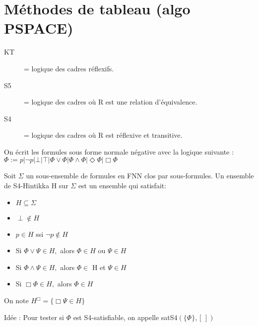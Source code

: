 \documentclass[10pt,a4paper]{article}
\begin{document}
\section{Méthodes de tableau (algo PSPACE)}
\begin{description}
 \item[KT] = logique des cadres réflexifs.
 \item[S5] = logique des cadres où R est une relation d'équivalence.
 \item[S4] = logique des cadres où R est réflexive et transitive.
\end{description}

On écrit les formules sous forme normale négative avec la logique suivante :\\
 $ \Phi := p  |  \lnot p  |  \bot  |  \top  |  \Phi \vee \Phi  |  \Phi \wedge \Phi  |  \Diamond \Phi  |  \Box \Phi $

\begin{definition}
 Soit $\Sigma$ un sous-ensemble de formules en FNN clos par sous-formules. Un ensemble de S4-Hintikka H sur $\Sigma$ est un ensemble qui satisfait:
\begin{itemize}
 \item $H \subseteq \Sigma$
 \item $\perp \not \in H$
 \item $p \in H$ ssi $\lnot p \not \in H$
 \item Si $\Phi\vee\Psi \in H,$ alors $\Phi \in H$ ou $\Psi \in H$
  \item Si $\Phi\wedge\Psi \in H,$ alors $\Phi \in$ H et $\Psi \in H$
  \item Si $\Box \Phi \in H,$ alors $\Phi \in H$
\end{itemize}
On note $H^{\Box} = \{\Box \Psi \in H \}$
\end{definition}


Idée : Pour tester si $\Phi$ est S4-satisfiable, on appelle satS4$(\{\Phi\}, [\,])$
\end{document}
